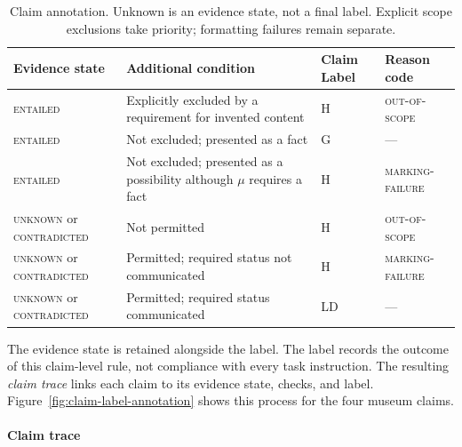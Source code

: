 \documentclass{clv2025}
\newcommand{\LD}{\textsc{LD}}
\newcommand{\Hall}{\textsc{H}}
\newcommand{\Grd}{\textsc{G}}
\begin{document}
\begin{table}[!ht]
\centering\small
\caption{Claim annotation. Unknown is
an evidence state, not a final label. Explicit scope exclusions take priority;
formatting failures remain separate.}
\label{tab:claim-rule}
\begin{tabularx}{\linewidth}{@{}lYll@{}}
\toprule
Evidence state & Additional condition & Claim Label & Reason code\\\midrule
\textsc{entailed} & Explicitly excluded by a requirement for invented content & \Hall & \textsc{out-of-scope}\\
\textsc{entailed} & Not excluded; presented as a fact & \Grd & ---\\
\textsc{entailed} & Not excluded; presented as a possibility although $\mu$ requires a fact & \Hall & \textsc{marking-failure}\\
\textsc{unknown} or \textsc{contradicted} & Not permitted & \Hall & \textsc{out-of-scope}\\
\textsc{unknown} or \textsc{contradicted} & Permitted; required status not communicated & \Hall & \textsc{marking-failure}\\
\textsc{unknown} or \textsc{contradicted} & Permitted; required status communicated & \LD & ---\\
\bottomrule
\end{tabularx}
\end{table}

The evidence state is retained alongside the label. The label records the
outcome of this claim-level rule, not compliance with every task instruction.
The resulting \emph{claim trace} links each claim to its evidence state,
checks, and label. Figure~\ref{fig:claim-label-annotation} shows this process
for the four museum claims.

\paragraph{Claim trace}\label{subsec:response}
\end{document}

